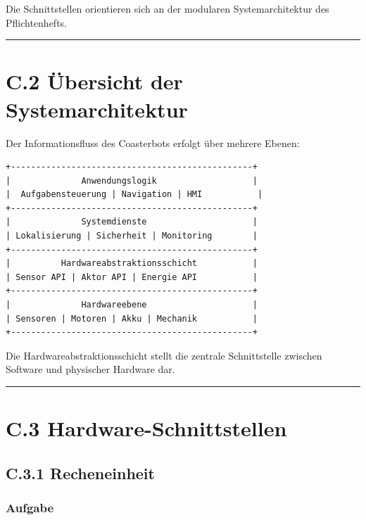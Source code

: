 \documentclass[
  a4paper,
  12pt,
  DIV=12,        %
  parskip=half,  %
  headings=small %
]{scrartcl}
\theoremstyle{definition}
\theoremstyle{definition}
\begin{document}
Die Schnittstellen orientieren sich an der modularen Systemarchitektur
des Pflichtenhefts.

\begin{center}\rule{0.5\linewidth}{0.5pt}\end{center}

\section{C.2 Übersicht der
Systemarchitektur}\label{c.2-uxfcbersicht-der-systemarchitektur}

Der Informationsfluss des Coasterbots erfolgt über mehrere Ebenen:

\begin{verbatim}
+------------------------------------------------+
|              Anwendungslogik                   |
|  Aufgabensteuerung | Navigation | HMI           |
+------------------------------------------------+
|              Systemdienste                     |
| Lokalisierung | Sicherheit | Monitoring        |
+------------------------------------------------+
|          Hardwareabstraktionsschicht           |
| Sensor API | Aktor API | Energie API           |
+------------------------------------------------+
|              Hardwareebene                     |
| Sensoren | Motoren | Akku | Mechanik           |
+------------------------------------------------+
\end{verbatim}

Die Hardwareabstraktionsschicht stellt die zentrale Schnittstelle
zwischen Software und physischer Hardware dar.

\begin{center}\rule{0.5\linewidth}{0.5pt}\end{center}

\section{C.3 Hardware-Schnittstellen}\label{c.3-hardware-schnittstellen}

\subsection{C.3.1 Recheneinheit}\label{c.3.1-recheneinheit}

\subsubsection{Aufgabe}\label{aufgabe-12}
\end{document}
